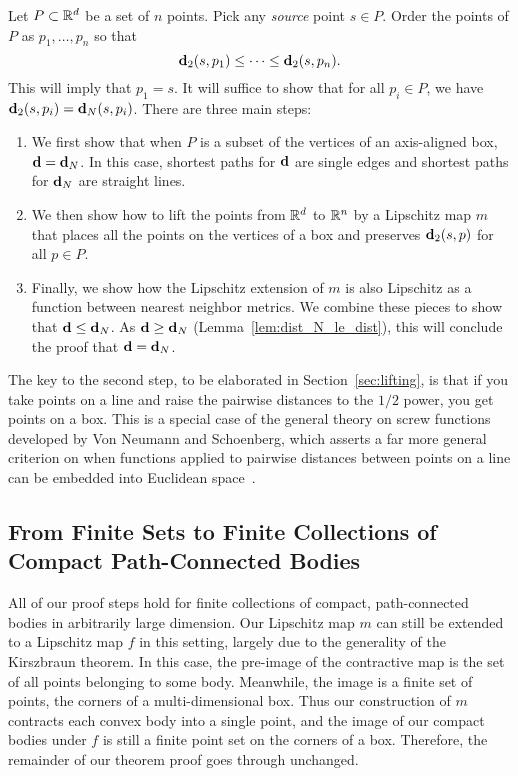 \label{sec:the_proof}

  Let $P\subset \mathbb{R}^d$ be a set of $n$ points.
  Pick any \emph{source} point $s\in P$.
  Order the points of $P$ as $p_1,\ldots ,p_n$ so that
  \[
    \mathbf{d}_2(s,p_1) \le \cdots \le \mathbf{d}_2(s, p_n).
  \]
  This will imply that $p_1 = s$.
  It will suffice to show that for all $p_i\in P$, we have $\mathbf{d}_2(s,p_i) = \mathbf{d}_N(s,p_i)$.
  There are three main steps:
  \begin{enumerate}
    \item We first show that when $P$ is a subset of the vertices of an axis-aligned box, $\mathbf{d} = \mathbf{d}_N$.  In this case, shortest paths for $\mathbf{d}$ are single edges and shortest paths for $\mathbf{d}_N$ are straight lines.
    \item We then show how to lift the points from $\mathbb{R}^d$ to $\mathbb{R}^n$ by a Lipschitz map $m$ that places all the points on the vertices of a box and preserves $\mathbf{d}_2(s,p)$ for all $p\in P$.
    \item Finally, we show how the Lipschitz extension of $m$ is also Lipschitz as a function between nearest neighbor metrics.  We combine these pieces to show that $\mathbf{d} \le \mathbf{d}_N$.  As $\mathbf{d} \ge \mathbf{d}_N$ (Lemma~\ref{lem:dist_N_le_dist}), this will conclude the proof that $\mathbf{d} = \mathbf{d}_N$.
  \end{enumerate}
The key to the second step, to be elaborated in Section~\ref{sec:lifting},
is that if you take points on a line and raise the pairwise distances to
the $1/2$ power, you get points on a box. This is a special case of the
general theory on screw functions developed by Von Neumann and Schoenberg,
which asserts a far more general criterion on when functions applied to
pairwise distances between points on a line can be embedded into Euclidean
space~\cite{VonNeumann41}.
  
  
  
\subsection{From Finite Sets to Finite Collections of Compact Path-Connected Bodies}
\label{sec:bodies}
All of our proof steps hold for finite collections of compact,
path-connected bodies in arbitrarily large dimension. Our Lipschitz map $m$ can
still be extended to a Lipschitz map $f$ in this setting, largely due to the
generality of the Kirszbraun theorem. In this case, the pre-image of the
contractive map is the set of all points belonging to some body. Meanwhile, the image is a finite set of points, the corners of a multi-dimensional box.
Thus our construction of $m$ contracts each convex
body into a single point, and the image of our
compact bodies under $f$ is still a finite point set on the corners of a
box. Therefore, the remainder of our theorem proof goes through unchanged.

